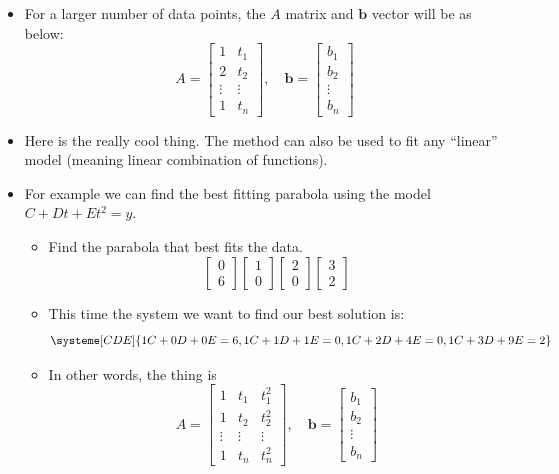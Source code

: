 \documentclass[11pt,oneside]{amsbook}
\theoremstyle{definition}
\theoremstyle{plain}
\theoremstyle{definition}
\theoremstyle{remark}
\numberwithin{equation}{section}
\numberwithin{figure}{section}
\begin{document}
\begin{itemize}
\begin{itemize}
  \end{itemize}
\item For a larger number of data points, the $A$ matrix and $\mathbf{b}$ vector will be as below:
  \[A=\begin{bmatrix}
      1&t_1\\
      2&t_2\\
      \vdots&\vdots\\
      1&t_n
    \end{bmatrix}
    ,\quad
    \mathbf{b}=\begin{bmatrix}b_1\\b_2\\\vdots\\b_n\end{bmatrix}
  \]
\item Here is the really cool thing. The method can also be used to fit any ``linear'' model (meaning linear combination of functions).
\item For example we can find the best fitting parabola using the model $C+Dt+Et^2=y$.
  \begin{itemize}
  \item Find the parabola that best fits the data.
    \[\begin{bmatrix}0\\6\end{bmatrix}
      \begin{bmatrix}1\\0\end{bmatrix}
      \begin{bmatrix}2\\0\end{bmatrix}
      \begin{bmatrix}3\\2\end{bmatrix}
    \]
  \item This time the system we want to find our best solution is:
    \[\systeme[CDE]{1C+0D+0E=6,
        1C+1D+1E=0,1C+2D+4E=0,1C+3D+9E=2}
    \]
  \item In other words, the thing is
    \[A=\begin{bmatrix}
        1&t_1&t_1^2\\
        1&t_2&t_2^2\\
        \vdots&\vdots&\vdots\\
        1&t_n&t_n^2
      \end{bmatrix}
      ,\quad
      \mathbf{b}=\begin{bmatrix}
        b_1\\b_2\\\vdots\\b_n

\end{bmatrix}\]
\end{itemize}
\end{itemize}
\end{document}
